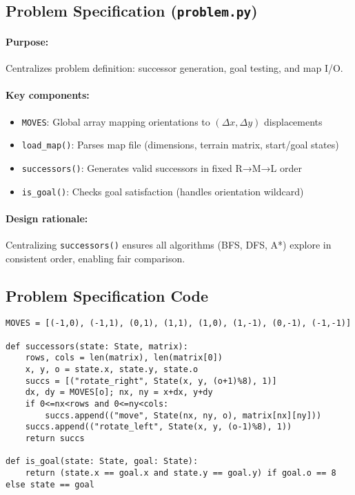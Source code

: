 \documentclass[11pt,a4paper]{article}
\begin{document}
\subsection{Problem Specification (\texttt{problem.py})}
\paragraph{Purpose:} Centralizes problem definition: successor generation, goal testing, and map I/O.

\paragraph{Key components:}
\begin{itemize}[leftmargin=1.5cm,itemsep=0.1em]
    \item \texttt{MOVES}: Global array mapping orientations to $(\Delta x, \Delta y)$ displacements
    \item \texttt{load\_map()}: Parses map file (dimensions, terrain matrix, start/goal states)
    \item \texttt{successors()}: Generates valid successors in fixed R→M→L order
    \item \texttt{is\_goal()}: Checks goal satisfaction (handles orientation wildcard)
\end{itemize}

\paragraph{Design rationale:}
Centralizing \texttt{successors()} ensures all algorithms (BFS, DFS, A*) explore in consistent order, enabling fair comparison.

\subsection{Problem Specification Code}
\begin{lstlisting}
MOVES = [(-1,0), (-1,1), (0,1), (1,1), (1,0), (1,-1), (0,-1), (-1,-1)]

def successors(state: State, matrix):
    rows, cols = len(matrix), len(matrix[0])
    x, y, o = state.x, state.y, state.o
    succs = [("rotate_right", State(x, y, (o+1)%8), 1)]
    dx, dy = MOVES[o]; nx, ny = x+dx, y+dy
    if 0<=nx<rows and 0<=ny<cols:
        succs.append(("move", State(nx, ny, o), matrix[nx][ny]))
    succs.append(("rotate_left", State(x, y, (o-1)%8), 1))
    return succs

def is_goal(state: State, goal: State):
    return (state.x == goal.x and state.y == goal.y) if goal.o == 8 else state == goal
\end{lstlisting}
\end{document}
